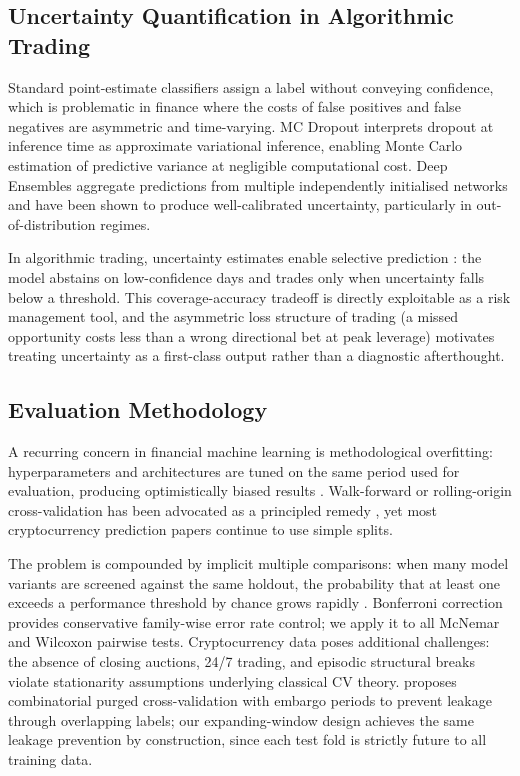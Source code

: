 \documentclass[final,3p,times,authoryear]{elsarticle}
\begin{document}
\subsection{Uncertainty Quantification in Algorithmic Trading}

Standard point-estimate classifiers assign a label without conveying
confidence, which is problematic in finance where the costs of false
positives and false negatives are asymmetric and time-varying.
MC Dropout \citep{gal2016dropout} interprets dropout at inference time
as approximate variational inference, enabling Monte Carlo estimation of
predictive variance at negligible computational cost.
Deep Ensembles \citep{lakshminarayanan2017simple} aggregate predictions
from multiple independently initialised networks and have been shown to
produce well-calibrated uncertainty, particularly in out-of-distribution
regimes.

In algorithmic trading, uncertainty estimates enable selective
prediction \citep{geifman2017selective}: the model abstains on
low-confidence days and trades only when uncertainty falls below a
threshold.
This coverage-accuracy tradeoff is directly exploitable as a risk
management tool, and the asymmetric loss structure of trading (a missed
opportunity costs less than a wrong directional bet at peak leverage)
motivates treating uncertainty as a first-class output rather than a
diagnostic afterthought.

\subsection{Evaluation Methodology}

A recurring concern in financial machine learning is methodological
overfitting: hyperparameters and architectures are tuned on the same
period used for evaluation, producing optimistically biased results
\citep{tashman2000out, arlot2010survey}.
Walk-forward or rolling-origin cross-validation has been advocated as a
principled remedy \citep{bergmeir2012time}, yet most cryptocurrency
prediction papers continue to use simple splits.

The problem is compounded by implicit multiple comparisons: when many
model variants are screened against the same holdout, the probability
that at least one exceeds a performance threshold by chance grows
rapidly \citep{harvey2016p}.
Bonferroni correction provides conservative family-wise error rate
control; we apply it to all McNemar and Wilcoxon pairwise tests.
Cryptocurrency data poses additional challenges: the absence of
closing auctions, 24/7 trading, and episodic structural breaks
violate stationarity assumptions underlying classical CV theory.
\citet{lopezdeprado2018advances} proposes combinatorial purged
cross-validation with embargo periods to prevent leakage through
overlapping labels; our expanding-window design achieves the same
leakage prevention by construction, since each test fold is strictly
future to all training data.
\end{document}
